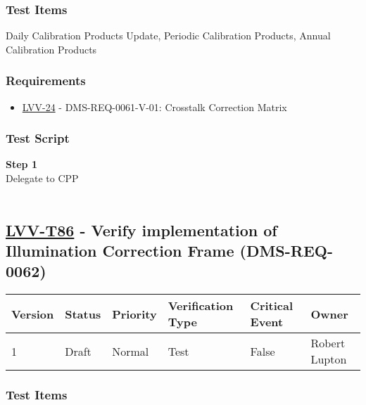 \hypertarget{test-items-61}{%
\subsubsection{Test Items}\label{test-items-61}}

Daily Calibration Products Update, Periodic Calibration Products, Annual
Calibration Products

\hypertarget{requirements-62}{%
\subsubsection{Requirements}\label{requirements-62}}

\begin{itemize}
\tightlist
\item
  \href{https://jira.lsstcorp.org/browse/LVV-24}{LVV-24} -
  DMS-REQ-0061-V-01: Crosstalk Correction Matrix
\end{itemize}

\hypertarget{test-script-62}{%
\subsubsection{Test Script}\label{test-script-62}}

\textbf{Step 1}\\
Delegate to CPP\\
~\\

\hypertarget{lvv-t86---verify-implementation-of-illumination-correction-frame-dms-req-0062}{%
\subsection{\texorpdfstring{\href{https://jira.lsstcorp.org/secure/Tests.jspa\#/testCase/LVV-T86}{LVV-T86}
- Verify implementation of Illumination Correction Frame
(DMS-REQ-0062)}{LVV-T86 - Verify implementation of Illumination Correction Frame (DMS-REQ-0062)}}\label{lvv-t86---verify-implementation-of-illumination-correction-frame-dms-req-0062}}

\begin{longtable}[]{@{}llllll@{}}
\toprule
Version & Status & Priority & Verification Type & Critical Event &
Owner\tabularnewline
\midrule
\endhead
1 & Draft & Normal & Test & False & Robert Lupton\tabularnewline
\bottomrule
\end{longtable}

\hypertarget{test-items-62}{%
\subsubsection{Test Items}\label{test-items-62}}


